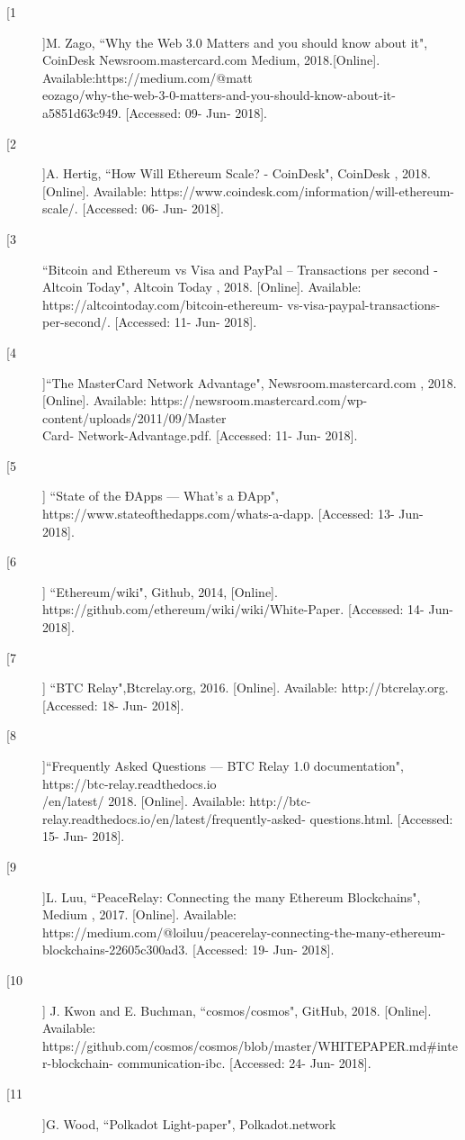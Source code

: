 \documentclass[a4paper,twoside,phd]{BYUPhys}
\begin{document}
\begin{description}
\item[[1]]M. Zago, ``Why the Web 3.0 Matters and you should know about it",
CoinDesk Newsroom.mastercard.com
Medium, 2018.[Online]. Available:https://medium.com/@matt\\eozago/why-the-web-3-0-matters-and-you-should-know-about-it-a5851d63c949. [Accessed: 09- Jun- 2018].
\item[[2]]A. Hertig, ``How Will Ethereum Scale? - CoinDesk", CoinDesk
, 2018. [Online]. Available:
 https://www.coindesk.com/information/will-ethereum-scale/. [Accessed: 06- Jun- 2018].
\item[[3]``Bitcoin and Ethereum vs Visa and PayPal – Transactions per second - Altcoin
  Today",
Altcoin Today
, 2018. [Online]. Available: https://altcointoday.com/bitcoin-ethereum-
 vs-visa-paypal-transactions-per-second/. [Accessed: 11- Jun- 2018].
\item[[4]]``The MasterCard Network Advantage", Newsroom.mastercard.com
, 2018. [Online].
 Available: https://newsroom.mastercard.com/wp-content/uploads/2011/09/Master\\Card-
 Network-Advantage.pdf. [Accessed: 11- Jun- 2018].
\item[[5]] ``State of the ÐApps — What's a ÐApp",
https://www.stateofthedapps.com/whats-a-dapp. [Accessed: 13- Jun- 2018].
\item[[6]]  ``Ethereum/wiki", Github, 2014, [Online]. https://github.com/ethereum/wiki/wiki/White-Paper. [Accessed: 14- Jun- 2018].
\item[[7]] ``BTC Relay",Btcrelay.org, 2016. [Online]. Available: http://btcrelay.org. [Accessed: 18-
Jun- 2018].
\item[[8]]``Frequently Asked Questions — BTC Relay 1.0 documentation", https://btc-relay.readthedocs.io\\/en/latest/
 2018. [Online]. Available: http://btc-relay.readthedocs.io/en/latest/frequently-asked-
 questions.html. [Accessed: 15- Jun- 2018].
\item[[9]]L. Luu, ``PeaceRelay: Connecting the many Ethereum Blockchains", Medium
, 2017.
 [Online]. Available: https://medium.com/@loiluu/peacerelay-connecting-the-many-ethereum-
 blockchains-22605c300ad3. [Accessed: 19- Jun- 2018].
\item[[10]] J. Kwon and E. Buchman, ``cosmos/cosmos",
GitHub, 2018. [Online]. Available:
 https://github.com/cosmos/cosmos/blob/master/WHITEPAPER.md\#inter-blockchain-
 communication-ibc. [Accessed: 24- Jun- 2018].
\item[[11]]G. Wood, ``Polkadot Light-paper", Polkadot.network

\end{description}
\end{document}
